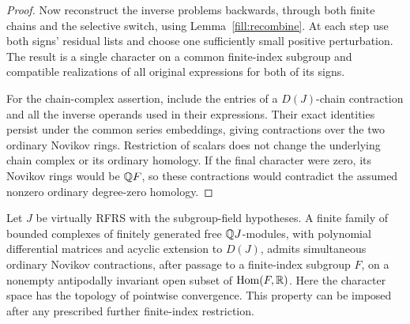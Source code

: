 \begin{proof}
Now reconstruct the inverse problems backwards, through both
finite chains and the selective switch, using
Lemma~\ref{fill:recombine}.  At each step use both signs' residual
lists and choose one sufficiently small positive perturbation.
The result is a single character on a common finite-index subgroup
and compatible realizations of all original expressions for both
of its signs.

For the chain-complex assertion, include the entries of a
\(D(J)\)-chain contraction and all the inverse operands used in
their expressions.  Their exact identities persist under the
common series embeddings, giving contractions over the two
ordinary Novikov rings. Restriction of scalars does not change the
underlying chain complex or its ordinary homology. If the final
character were zero, its Novikov rings would be \(\mathbb Q F\), so these
contractions would contradict the assumed nonzero ordinary
degree-zero homology.
\end{proof}

\begin{corollary}\label{fill:rfrs-novikov}
Let \(J\) be virtually RFRS with the subgroup-field hypotheses.
A finite family of bounded complexes of finitely generated free
\(\mathbb Q J\)-modules, with polynomial differential matrices and acyclic
extension to \(D(J)\), admits simultaneous ordinary Novikov contractions,
after passage to a finite-index subgroup \(F\), on a nonempty
antipodally invariant open subset of \(\operatorname{Hom}(F,\mathbb R)\).
Here the character space has the topology of pointwise convergence.
This property can be imposed after any prescribed further finite-index
restriction.
\end{corollary}


